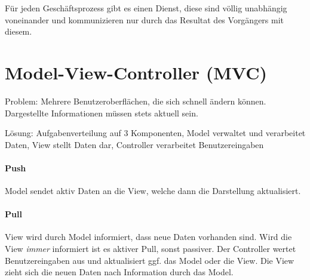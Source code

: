 Für jeden Geschäftsprozess gibt es einen Dienst, diese sind völlig unabhängig
voneinander und kommunizieren nur durch das Resultat des Vorgängers mit diesem.

\section{Model-View-Controller
(MVC)}\label{model-view-controller-mvc}

Problem: Mehrere Benutzeroberflächen, die sich schnell ändern können.
Dargestellte Informationen müssen stets aktuell sein.

Lösung: Aufgabenverteilung auf 3 Komponenten, Model verwaltet und verarbeitet
Daten, View stellt Daten dar, Controller verarbeitet Benutzereingaben

\paragraph{Push}\label{push-1}

Model sendet aktiv Daten an die View, welche dann die Darstellung
aktualisiert.

\paragraph{Pull}\label{pull-1}

View wird durch Model informiert, dass neue Daten vorhanden sind. Wird
die View \emph{immer} informiert ist es aktiver Pull, sonst passiver.
Der Controller wertet Benutzereingaben aus und aktualisiert ggf. das
Model oder die View. Die View zieht sich die neuen Daten nach
Information durch das Model.
